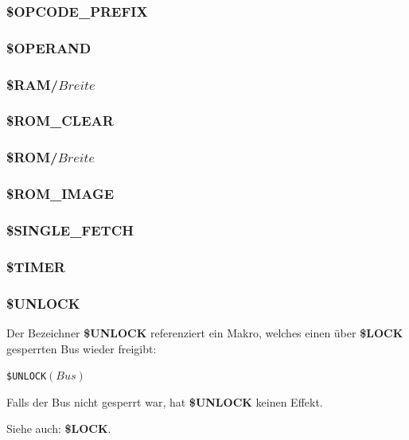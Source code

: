 \documentclass{scrartcl}
\begin{document}
\subsubsection{\$OPCODE\_PREFIX}

\subsubsection{\$OPERAND}

\subsubsection{\$RAM/$Breite$}

\subsubsection{\$ROM\_CLEAR}

\subsubsection{\$ROM/$Breite$}

\subsubsection{\$ROM\_IMAGE}

\subsubsection{\$SINGLE\_FETCH}

\subsubsection{\$TIMER}

\subsubsection{\$UNLOCK}

\noindent Der Bezeichner \textbf{\$UNLOCK} referenziert ein Makro, welches einen über \textbf{\$LOCK} gesperrten Bus wieder freigibt:

\vspace{10pt}
\texttt{\$UNLOCK$(Bus)$}

\vspace{10pt}
\noindent Falls der Bus nicht gesperrt war, hat \textbf{\$UNLOCK} keinen Effekt.

\vspace{10pt}
\noindent Siehe auch: \textbf{\$LOCK}.
\end{document}
